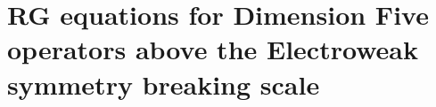 \appendix

%
%
\section{RG equations for Dimension Five operators 
	above the Electroweak symmetry breaking scale}

